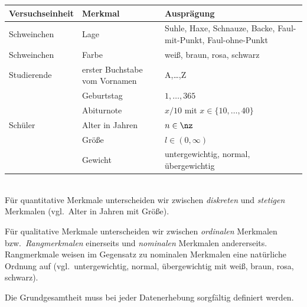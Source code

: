 \begin{bsp} 
    \begin{mytable}
        \begin{tabular}{lll}
            \hline
            \textbf{Versuchseinheit} & \textbf{Merkmal} & \textbf{Ausprägung} \\
            \hline
            Schweinchen & Lage & Suhle, Haxe, Schnauze, Backe, Faul-mit-Punkt, Faul-ohne-Punkt \\
            Schweinchen & Farbe & weiß, braun, rosa, schwarz \\
            Studierende & erster Buchstabe vom Vornamen & A,\dots,Z \\
            & Geburtstag & $1,\dots,365$ \\
            & Abiturnote & $x/10$ mit $x\in\{10,\dots,40\}$ \\
            Schüler     & Alter in Jahren & $n\in\nz$ \\
            & Größe & $l\in(0,\infty)$ \\
            & Gewicht & untergewichtig, normal, übergewichtig \\
            \hline
        \end{tabular}
    \end{mytable}
\end{bsp}

\begin{defi} \\
    Für quantitative \gls{Merkmal}e unterscheiden wir zwischen \emph{diskreten} und \emph{stetigen} \gls{Merkmal}en (vgl.\ Alter in Jahren mit Größe).

    Für qualitative \gls{Merkmal}e unterscheiden wir zwischen \emph{ordinalen} \gls{Merkmal}en bzw.\ \emph{Rangmerkmalen} einerseits und \emph{nominalen} \gls{Merkmal}en andererseits.
    Rangmerkmale weisen im Gegensatz zu nominalen \gls{Merkmal}en eine natürliche Ordnung auf (vgl.\ untergewichtig, normal, übergewichtig mit weiß, braun, rosa, schwarz).
\end{defi}


Die \gls{Grundgesamtheit} muss bei jeder \gls{Datenerhebung} sorgfältig definiert werden.

